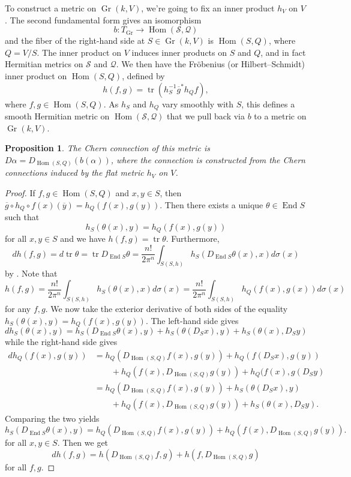 \documentclass[10pt,a4paper]{article}
\newtheorem{prop}[theo]{Proposition}
\newtheorem*{proof}{Proof}
\newcommand{\cc}[1]{\mathcal{#1}}
\def\ov#1{\overline{#1}}
\DeclareMathOperator{\Gr}{Gr}
\DeclareMathOperator{\End}{End}
\DeclareMathOperator{\Hom}{Hom}
\DeclareMathOperator{\tr}{tr}
\begin{document}
To construct a metric on $\Gr(k,V)$, we're going to fix an inner product $h_V$ on $V$. The second fundamental form gives an isomorphism
\[
b : T_{\Gr} \to \Hom(\cc S, \cc Q)
\]
and the fiber of the right-hand side at $S \in \Gr(k,V)$ is $\Hom(S, Q)$, where $Q = V/S$. The inner product on $V$ induces inner products on $S$ and $Q$, and in fact Hermitian metrics on $\cc S$ and $\cc Q$. We then have the Fr\"obenius (or Hilbert--Schmidt) inner product on $\Hom(S,Q)$, defined by
\[
h(f, g) = \tr(h_S^{-1} \ov g^* h_Q f),
\]
where $f, g \in \Hom(S,Q)$. As $h_S$ and $h_Q$ vary smoothly with $S$, this defines a smooth Hermitian metric on $\Hom(\cc S,\cc Q)$ that we pull back via $b$ to a metric on $\Gr(k,V)$.


\begin{prop}
The Chern connection of this metric is $D\alpha = D_{\Hom(S,Q)}(b(\alpha))$, where the connection is constructed from the Chern connections induced by the flat metric $h_V$ on $V$.
\end{prop}

\begin{proof}
If $f,g \in \Hom(S,Q)$ and $x, y \in S$, then $\ov g \circ h_Q \circ f(x)(\ov y) = h_Q(f(x), g(y))$. Then there exists a unique $\theta \in \End S$ such that
\[
h_S(\theta(x), y) = h_Q(f(x), g(y))
\]
for all $x,y \in S$
and we have $h(f, g) = \tr \theta$. Furthermore,
\[
d h(f, g)
= d \tr \theta
= \tr D_{\End S} \theta
= \frac{n!}{2\pi^n} \int_{S(S,h)} h_S(D_{\End S} \theta(x), x) d\sigma(x)
\]
by .
Note that
\[
h(f, g)
= \frac{n!}{2\pi^n} \int_{S(S,h)} h_S(\theta(x),x) d\sigma(x)
= \frac{n!}{2\pi^n} \int_{S(S,h)} h_Q(f(x),g(x)) d\sigma(x)
\]
for any $f, g$.
We now take the exterior derivative of both sides of the equality  $h_S(\theta(x), y) = h_Q(f(x), g(y))$.
The left-hand side gives
\[
d h_S(\theta(x), y)
= h_S(D_{\End S}\theta (x), y)
+ h_S(\theta(D_Sx), y)
+ h_S(\theta(x), D_S y)
\]
while the right-hand side gives
\begin{align*}
d h_Q(f(x), g(y))
&= h_Q(D_{\Hom(S,Q)}f (x), g(y))
+ h_Q(f(D_S x), g(y))
\\
&\qquad
{}+ h_Q(f(x), D_{\Hom(S,Q)} g(y))
+ h_Q(f(x), g(D_Sy)
\\
&= h_Q(D_{\Hom(S,Q)}f (x), g(y))
+ h_S(\theta(D_Sx), y)
\\
&\qquad
+ h_Q(f(x), D_{\Hom(S,Q)} g(y))
+ h_S(\theta(x), D_S y).
\end{align*}
Comparing the two yields
\[
h_S(D_{\End S} \theta(x), y)
= h_Q(D_{\Hom(S,Q)}f (x), g(y))
+ h_Q(f(x), D_{\Hom(S,Q)} g(y)).
\]
for all $x, y \in S$.
Then we get
\[
d h(f, g)
= h(D_{\Hom(S,Q)}f, g)
+ h(f, D_{\Hom(S,Q)} g)
\]
for all $f,g$.
\end{proof}
\end{document}
